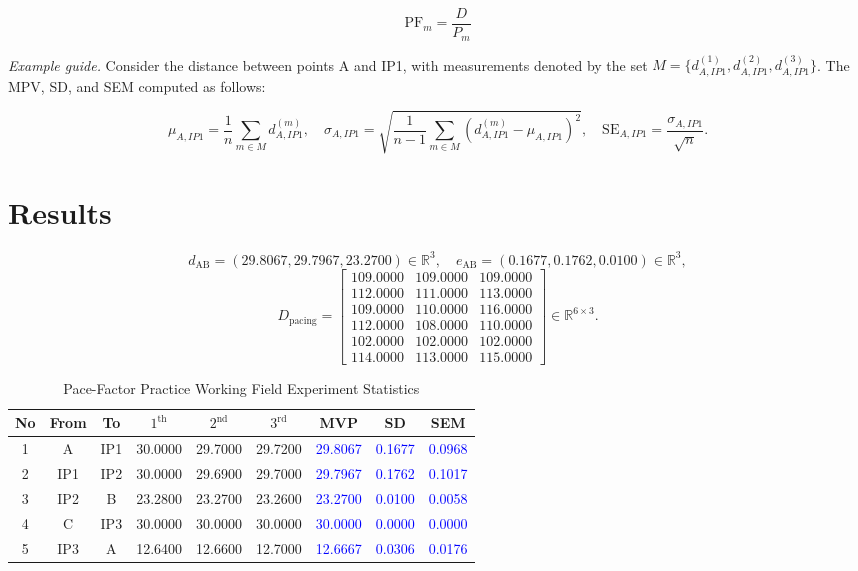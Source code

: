 \documentclass[12pt]{article}
\begin{document}
$$\text{PF}_m = \frac{D}{P_m}$$

\textit{Example guide.} Consider the distance between points A and IP1, with measurements denoted by the set $M = \{d_{A,IP1}^{(1)}, d_{A,IP1}^{(2)}, d_{A,IP1}^{(3)}\}$. The MPV, SD, and SEM computed as follows:

$$\mu_{A,IP1} = \frac{1}{n} \sum_{m \in M} d_{A,IP1}^{(m)}, \quad \sigma_{A,IP1} = \sqrt{\frac{1}{n-1} \sum_{m \in M} (d_{A,IP1}^{(m)} - \mu_{A,IP1})^2}, \quad
\text{SE}_{A,IP1} = \frac{\sigma_{A,IP1}}{\sqrt{n}}.$$


\newpage
\section*{Results}

$$d_{\text{AB}} = (29.8067, 29.7967, 23.2700) \in \mathbb{R}^3, \quad e_{\text{AB}} = (0.1677, 0.1762, 0.0100) \in \mathbb{R}^3,$$
$$D_{\text{pacing}} = \begin{bmatrix}
   109.0000 & 109.0000 & 109.0000 \\
   112.0000 & 111.0000 & 113.0000 \\ 
   109.0000& 110.0000& 116.0000\\
   112.0000& 108.0000& 110.0000\\
   102.0000& 102.0000& 102.0000 \\
   114.0000 & 113.0000 & 115.0000 
   \end{bmatrix} \in \mathbb{R}^{6 \times 3}.$$

\begin{table}[ht!]
\centering
\begin{tabular}{ccccccccc}
\hline
No & From & To  & $1^{\operatorname{th}}$  & $2^{\operatorname{nd}}$  & $3^{\operatorname{rd}}$   & MVP & SD & SEM \\
\hline
1 & A & IP1 & 30.0000 & 29.7000 & 29.7200 & \textcolor{blue}{29.8067} & \textcolor{blue}{0.1677} & \textcolor{blue}{0.0968} \\
2 & IP1 & IP2 & 30.0000 & 29.6900 & 29.7000 & \textcolor{blue}{29.7967} & \textcolor{blue}{0.1762} & \textcolor{blue}{0.1017} \\
3 & IP2 & B & 23.2800 & 23.2700 & 23.2600 & \textcolor{blue}{23.2700} & \textcolor{blue}{0.0100} & \textcolor{blue}{0.0058}  \\
4 & C & IP3 & 30.0000 & 30.0000 & 30.0000 & \textcolor{blue}{30.0000} & \textcolor{blue}{0.0000} & \textcolor{blue}{0.0000} \\
5 & IP3 & A & 12.6400 & 12.6600 & 12.7000 & \textcolor{blue}{12.6667} & \textcolor{blue}{0.0306} & \textcolor{blue}{0.0176} \\
\hline
\end{tabular}
\caption{Pace-Factor Practice Working Field Experiment Statistics} 
\end{table}
\end{document}
